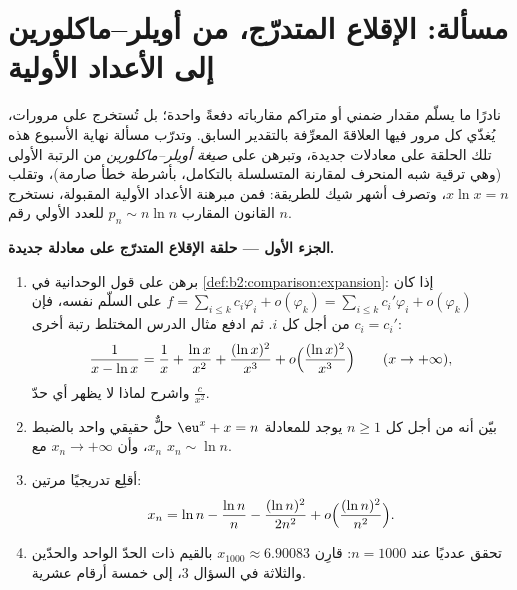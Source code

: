 \section{مسألة: الإقلاع المتدرّج، من أويلر--ماكلورين إلى
الأعداد الأولية}

نادرًا ما يسلّم مقدار ضمني أو متراكم مقارباته
دفعةً واحدة؛ بل تُستخرج على مرورات، يُغذّي كل مرور فيها
العلاقةَ المعرِّفة بالتقدير السابق.
وتدرّب مسألة نهاية الأسبوع هذه تلك الحلقة على معادلات جديدة، وتبرهن
على \emph{صيغة أويلر--ماكلورين} من الرتبة الأولى (وهي ترقية شبه المنحرف
لمقارنة المتسلسلة بالتكامل، بأشرطة خطأ صارمة)،
وتقلب $x\ln x = n$، وتصرف أشهر شيك للطريقة:
فمن مبرهنة الأعداد الأولية المقبولة، نستخرج القانون
المقارب $p_n \sim n\ln n$ للعدد الأولي رقم $n$.

\begin{problem}
\label{pb:b2:comparison:1}

\medskip
\noindent\textbf{الجزء الأول --- حلقة الإقلاع المتدرّج على معادلة
جديدة.}
\begin{enumerate}
  \item برهن على قول الوحدانية في
        \cref{def:b2:comparison:expansion}: إذا كان $f = \sum_{i\leq
        k} c_i\varphi_i + o(\varphi_k) = \sum_{i \leq k}
        c_i'\varphi_i + o(\varphi_k)$ على السلّم نفسه، فإن
        $c_i = c_i'$ من أجل كل $i$. ثم ادفع مثال الدرس
        المختلط رتبة أخرى:
        \[
        \frac{1}{x - \ln x} = \frac1x + \frac{\ln x}{x^2} +
        \frac{(\ln x)^2}{x^3} + o\Bigl(\frac{(\ln
        x)^2}{x^3}\Bigr) \qquad (x \to +\infty),
        \]
        واشرح لماذا لا يظهر أي حدّ $\frac{c}{x^2}$.
  \item بيّن أنه من أجل كل $n \geq 1$ يوجد للمعادلة $\eu^x + x =
        n$ حلٌّ حقيقي واحد بالضبط $x_n$، وأن $x_n
        \to +\infty$ مع $x_n \sim \ln n$.
  \item أقلِع تدريجيًا مرتين:
        \[
        x_n = \ln n - \frac{\ln n}{n} - \frac{(\ln n)^2}{2n^2} +
        o\Bigl(\frac{(\ln n)^2}{n^2}\Bigr).
        \]
  \item تحقق عدديًا عند $n = 1000$: قارِن $x_{1000}
        \approx 6.90083$ بالقيم ذات الحدّ الواحد والحدّين والثلاثة
        في السؤال 3، إلى خمسة أرقام عشرية.
\end{enumerate}


\end{problem}
